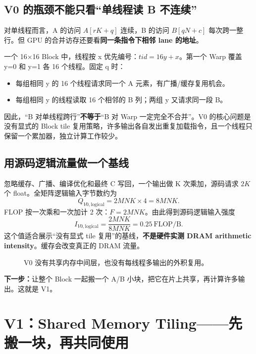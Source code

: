\documentclass[UTF8,11pt,a4paper,fontset=fandol]{ctexart}
\newcommand{\pagebreakhere}{\clearpage}
\begin{document}
\subsection{V0 的瓶颈不能只看“单线程读 B 不连续”}
对单线程而言，A 的访问 $A[rK+q]$ 连续，B 的访问 $B[qN+c]$ 每次跨一整行。但 GPU 的合并访存还要看\textbf{同一条指令下相邻 lane 的地址}。

一个 16×16 Block 中，线程按 x 优先编号：$tid=16y+x$。第一个 Warp 覆盖 y=0 和 y=1 各 16 个线程。固定 q 时：
\begin{itemize}
\item 每组相同 y 的 16 个线程请求同一个 A 元素，有广播/缓存复用机会。
\item 每组相同 y 的线程读取 16 个相邻的 B 列；两组 y 又请求同一段 B。
\end{itemize}
因此，“B 对单线程跨行”\textbf{不等于}“B 对 Warp 一定完全不合并”。V0 的核心问题是没有显式的 Block tile 复用策略，许多输出各自发出重复加载指令，且一个线程只保留一个累加器，独立计算工作较少。

\subsection{用源码逻辑流量做一个基线}
忽略缓存、广播、编译优化和最终 C 写回，一个输出做 K 次乘加，源码请求 $2K$ 个 float。全矩阵逻辑输入字节数约为
\[
Q_{V0,\mathrm{logical}}=2MNK\times4=8MNK.
\]
FLOP 按一次乘和一次加计 2 次：$F=2MNK$。由此得到源码逻辑输入强度
\[
I_{V0,\mathrm{logical}}=\frac{2MNK}{8MNK}=0.25\ \mathrm{FLOP/B}.
\]
这个值适合展示“没有显式 tile 复用”的基线，\textbf{不是硬件实测 DRAM arithmetic intensity}。缓存会改变真正的 DRAM 流量。

\begin{figure}[H]\centering
{}
\caption{V0 没有共享内存中间层，也没有每线程多输出的外积复用。}
\end{figure}

\textbf{下一步：}让整个 Block 一起搬一个 A/B 小块，把它在片上共享，再计算许多输出。这就是 V1。
\pagebreakhere

\section{V1：Shared Memory Tiling——先搬一块，再共同使用}
\end{document}
